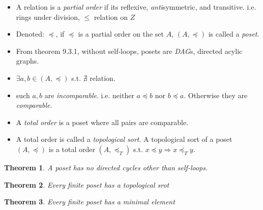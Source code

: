 \documentclass[10pt]{article}
\newcounter{set}
\newcommand{\Ra}{\Rightarrow}
\newtheorem{theorem}{Theorem}[subsection]
\begin{document}
\begin{itemize}
\item A relation is  a \emph{partial order} if
its reflexive, \emph{anti}symmetric, and transitive. i.e. rings under
division, $\le$ relation on $Z$
\item Denoted: $\preceq$, if $\preceq$ is a partial order on the set
  $A$, $(A, \preceq)$ is called a \emph{poset}.

\item From theorem 9.3.1, without self-loops, posets are \emph{DAG}s, directed acylic graphs.

\item $\exists a, b\in (A, \preceq)$ s.t. $\nexists$ relation.
\item such $a,b$ are \emph{incomparable}. i.e. neither $a\preceq b$
  nor $b\preceq a$. Otherwise they are \emph{comparable}.
\item A \emph{total order} is a poset where all pairs are comparable.
\item A total order is called a \emph{topological sort}. A topological
  sort of a poset $(A, \preceq)$ is a total order $(A, \preceq_T)$
  s.t. $x\preceq y \Ra x\preceq_T y$.
\end{itemize}
\begin{theorem}
A poset has no directed cycles other than self-loops.
\end{theorem} 
  \begin{theorem}
    Every finite poset has a topological srot
  \end{theorem}

  \begin{theorem}
    Every finite poset has a minimal element
  \end{theorem}
\end{document}
